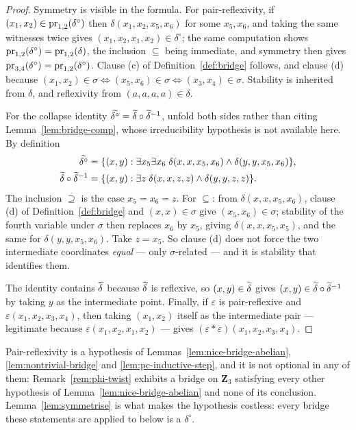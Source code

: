 \begin{proof}
Symmetry is visible in the formula. For pair-reflexivity, if
$(x_{1},x_{2})\in\operatorname*{pr}_{1,2}(\delta^{\circ})$ then
$\delta(x_{1},x_{2},x_{5},x_{6})$ for some $x_{5},x_{6}$, and taking the same
witnesses twice gives $(x_{1},x_{2},x_{1},x_{2})\in\delta^{\circ}$; the same
computation shows $\operatorname*{pr}_{1,2}(\delta^{\circ})=\operatorname*{pr}_{1,2}(\delta)$, the
inclusion $\subseteq$ being immediate, and symmetry then gives
$\operatorname*{pr}_{3,4}(\delta^{\circ})=\operatorname*{pr}_{1,2}(\delta^{\circ})$. Clause (c) of
Definition~\ref{def:bridge} follows, and clause (d) because
$(x_{1},x_{2})\in\sigma\iff(x_{5},x_{6})\in\sigma\iff(x_{3},x_{4})\in\sigma$.
Stability is inherited from $\delta$, and reflexivity from
$(a,a,a,a)\in\delta$.

For the collapse identity
$\widetilde{\delta^{\circ}}=\widetilde{\delta}\circ\widetilde{\delta}^{-1}$, unfold both
sides rather than citing Lemma~\ref{lem:bridge-comp}, whose irreducibility
hypothesis is not available here. By definition
\begin{align*}
  \widetilde{\delta^{\circ}}&=\{(x,y):\exists x_{5}\exists x_{6}\;
    \delta(x,x,x_{5},x_{6})\wedge\delta(y,y,x_{5},x_{6})\},\\
  \widetilde{\delta}\circ\widetilde{\delta}^{-1}&=\{(x,y):\exists z\;
    \delta(x,x,z,z)\wedge\delta(y,y,z,z)\}.
\end{align*}
The inclusion $\supseteq$ is the case $x_{5}=x_{6}=z$. For $\subseteq$: from
$\delta(x,x,x_{5},x_{6})$, clause (d) of Definition~\ref{def:bridge} and
$(x,x)\in\sigma$ give $(x_{5},x_{6})\in\sigma$; stability of the fourth
variable under $\sigma$ then replaces $x_{6}$ by $x_{5}$, giving
$\delta(x,x,x_{5},x_{5})$, and the same for $\delta(y,y,x_{5},x_{6})$. Take
$z=x_{5}$. So clause (d) does not force the two intermediate coordinates
\emph{equal} --- only $\sigma$-related --- and it is stability that identifies
them.

The identity contains $\widetilde{\delta}$ because $\widetilde{\delta}$ is reflexive, so
$(x,y)\in\widetilde{\delta}$ gives $(x,y)\in\widetilde{\delta}\circ\widetilde{\delta}^{-1}$ by
taking $y$ as the intermediate point. Finally, if $\varepsilon$ is
pair-reflexive and $\varepsilon(x_{1},x_{2},x_{3},x_{4})$, then taking
$(x_{1},x_{2})$ itself as the intermediate pair --- legitimate because
$\varepsilon(x_{1},x_{2},x_{1},x_{2})$ --- gives
$(\varepsilon\ast\varepsilon)(x_{1},x_{2},x_{3},x_{4})$.
\end{proof}

\begin{hazard}\label{haz:pair-reflexive}
Pair-reflexivity is a hypothesis of Lemmas~\ref{lem:nice-bridge-abelian},
\ref{lem:nontrivial-bridge} and \ref{lem:pc-inductive-step}, and it is not
optional in any of them: Remark~\ref{rem:phi-twist} exhibits a bridge on
$\mathbf Z_{3}$ satisfying every other hypothesis of
Lemma~\ref{lem:nice-bridge-abelian} and none of its conclusion.
Lemma~\ref{lem:symmetrise} is what makes the hypothesis costless: every bridge
these statements are applied to below is a $\delta^{\circ}$.
\end{hazard}

